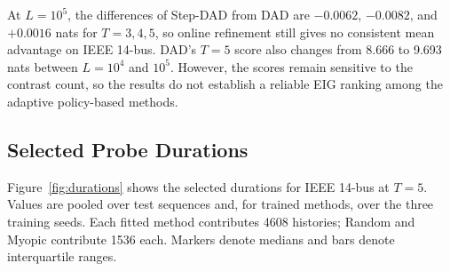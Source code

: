 \documentclass[conference,letterpaper]{IEEEtran}
\begin{document}
At $L=10^5$, the differences of Step-DAD from DAD are $-0.0062$, $-0.0082$, and $+0.0016$ nats for $T=3,4,5$, so online refinement still gives no consistent mean advantage on IEEE 14-bus. DAD's $T=5$ score also changes from 8.666 to 9.693 nats between $L=10^4$ and $10^5$. However, the scores remain sensitive to the contrast count, so the results do not establish a reliable EIG ranking among the adaptive policy-based methods.


\subsection{Selected Probe Durations}
Figure~\ref{fig:durations} shows the selected durations for IEEE 14-bus at $T=5$. Values are pooled over test sequences and, for trained methods, over the three training seeds. Each fitted method contributes 4608 histories; Random and Myopic contribute 1536 each. Markers denote medians and bars denote interquartile ranges.
\end{document}

